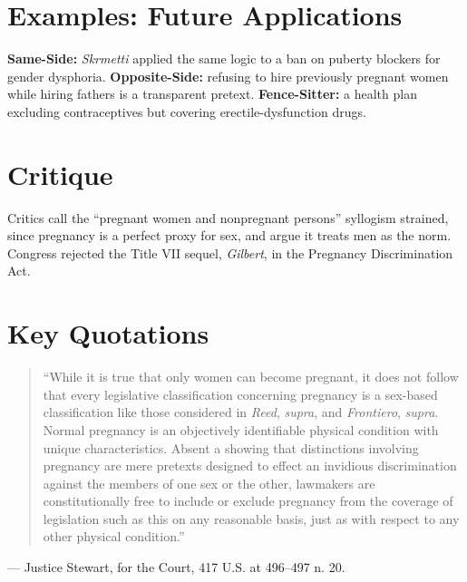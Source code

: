 \documentclass[12pt]{article}
\begin{document}
\section{Examples: Future Applications}
\textbf{Same-Side:} \textit{Skrmetti} applied the same logic to a ban on puberty blockers for gender dysphoria. \textbf{Opposite-Side:} refusing to hire previously pregnant women while hiring fathers is a transparent pretext. \textbf{Fence-Sitter:} a health plan excluding contraceptives but covering erectile-dysfunction drugs.

\section{Critique}
Critics call the ``pregnant women and nonpregnant persons'' syllogism strained, since pregnancy is a perfect proxy for sex, and argue it treats men as the norm. Congress rejected the Title VII sequel, \textit{Gilbert}, in the Pregnancy Discrimination Act.

\section{Key Quotations}
\begin{quote}
``While it is true that only women can become pregnant, it does not follow that every legislative classification concerning pregnancy is a sex-based classification like those considered in \textit{Reed}, \textit{supra}, and \textit{Frontiero}, \textit{supra}. Normal pregnancy is an objectively identifiable physical condition with unique characteristics. Absent a showing that distinctions involving pregnancy are mere pretexts designed to effect an invidious discrimination against the members of one sex or the other, lawmakers are constitutionally free to include or exclude pregnancy from the coverage of legislation such as this on any reasonable basis, just as with respect to any other physical condition.''
\end{quote}
\noindent --- Justice Stewart, for the Court, 417 U.S. at 496--497 n. 20.
\end{document}
